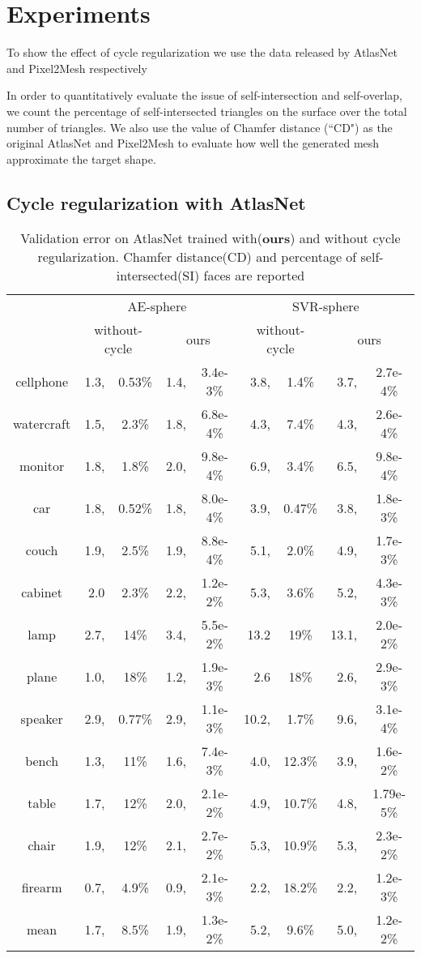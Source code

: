 \section{Experiments}

 To show the effect of cycle regularization we use the data released by AtlasNet and Pixel2Mesh respectively \cite{3DR2N2}

In order to quantitatively evaluate the issue of self-intersection and self-overlap, we count the percentage of self-intersected triangles on the surface over the total number of triangles. We also use the value of Chamfer distance (``CD") as the original AtlasNet and Pixel2Mesh to evaluate how well the generated mesh approximate the target shape.
\subsection{Cycle regularization with AtlasNet}

\begin{table*}
	\caption{Validation error on AtlasNet trained with(\textbf{ours}) and without cycle regularization. Chamfer distance(CD) and percentage of self-intersected(SI) faces are reported}
	\label{tab:seg}
	\centering
	\begin{tabular}{c|rc|rc|rc|rc|}
    \multirow{2}{*}{~} &\multicolumn{4}{c|}{AE-sphere}&\multicolumn{4}{c}{SVR-sphere}\\
	\cline{2-9}
	~& \multicolumn{2}{c|}{without-cycle} & \multicolumn{2}{c|}{ours} & \multicolumn{2}{c|}{without-cycle} & \multicolumn{2}{c|}{ours} \\
	\hline
	cellphone&1.3,&0.53\%&1.4,&3.4e-3\%&3.8,&1.4\%&3.7,&2.7e-4\%\\
	watercraft&1.5,&2.3\%&1.8,&6.8e-4\%&4.3,&7.4\%&4.3,&2.6e-4\%\\
	monitor&1.8,&1.8\%&2.0,&9.8e-4\%&6.9,&3.4\%&6.5,&9.8e-4\%\\
	car&1.8,&0.52\%&1.8,&8.0e-4\%&3.9,&0.47\%&3.8,&1.8e-3\%\\
	couch&1.9,&2.5\%&1.9,&8.8e-4\%&5.1,&2.0\%&4.9,&1.7e-3\%\\
	cabinet&2.0&2.3\%&2.2,&1.2e-2\%&5.3,&3.6\%&5.2,&4.3e-3\%\\
	lamp&2.7,&14\%&3.4,&5.5e-2\%&13.2&19\%&13.1,&2.0e-2\%\\
	plane&1.0,&18\%&1.2,&1.9e-3\%&2.6&18\%&2.6,&2.9e-3\%\\
	speaker&2.9,&0.77\%&2.9,&1.1e-3\%&10.2,&1.7\%&9.6,&3.1e-4\%\\
	bench&1.3,&11\%&1.6,&7.4e-3\%&4.0,&12.3\%&3.9,&1.6e-2\%\\
	table&1.7,&12\%&2.0,&2.1e-2\%&4.9,&10.7\%&4.8,&1.79e-5\%\\
	chair&1.9,&12\%&2.1,&2.7e-2\%&5.3,&10.9\%&5.3,&2.3e-2\%\\
	firearm&0.7,&4.9\%&0.9,&2.1e-3\%&2.2,&18.2\%&2.2,&1.2e-3\%\\
	\hline
	mean &1.7,&8.5\%&1.9,& 1.3e-2\% &5.2,&9.6\%&5.0,&1.2e-2\%\\
		
	\end{tabular}
\end{table*}
		
